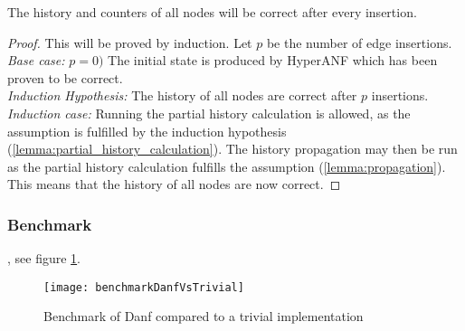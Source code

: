 \begin{theorem}
The history and counters of all nodes will be correct after every insertion.\\

\begin{proof} This will be proved by induction. Let $p$ be the number of edge insertions.\\

\noindent\textit{Base case:} $p = 0)$ The initial state is produced by HyperANF which has been proven to be correct.\\

\noindent\textit{Induction Hypothesis:} The history of all nodes are correct after $p$ insertions.\\

\iffalse
Given that the history of all nodes are correct after insertion $p$, they will be correct after insertion $p+1$.\\
\fi

\noindent\textit{Induction case:}
Running the partial history calculation is allowed, as the assumption is fulfilled by the induction hypothesis (\ref{lemma:partial_history_calculation}). The history propagation may then be run as the partial history calculation fulfills the assumption (\ref{lemma:propagation}). This means that the history of all nodes are now correct. 

\end{proof}
\end{theorem}


\subsubsection{Benchmark}
, see figure \ref{fig:benchmarkDanfVsTrivial}.


\begin{figure}[h]
\centering
\texttt{[image: benchmarkDanfVsTrivial]}    
\captionsetup{justification=centering}
\caption {Benchmark of Danf compared to a trivial implementation}
\label{fig:benchmarkDanfVsTrivial}
\end{figure}
